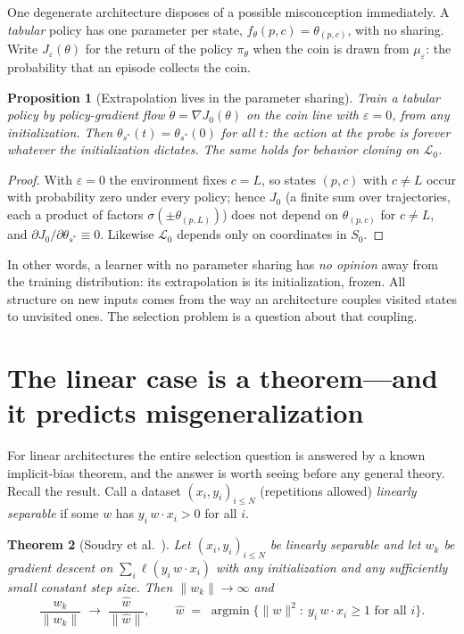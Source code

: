 \documentclass[11pt]{amsart}
\theoremstyle{plain}
\newtheorem{theorem}{Theorem}[section]
\newtheorem{proposition}[theorem]{Proposition}
\theoremstyle{definition}
\begin{document}
One degenerate architecture disposes of a possible misconception immediately. A \emph{tabular} policy has one parameter per state, $f_\theta(p,c)=\theta_{(p,c)}$, with no sharing. Write $J_\varepsilon(\theta)$ for the return of the policy $\pi_\theta$ when the coin is drawn from $\mu_\varepsilon$: the probability that an episode collects the coin.

\begin{proposition}[Extrapolation lives in the parameter sharing]\label{prop:tabular}
Train a tabular policy by policy-gradient flow $\dot\theta=\nabla J_0(\theta)$ on the coin line with $\varepsilon=0$, from any initialization. Then $\theta_{s^{*}}(t)=\theta_{s^{*}}(0)$ for all $t$: the action at the probe is forever whatever the initialization dictates. The same holds for behavior cloning on $\mathcal L_0$.
\end{proposition}

\begin{proof}
With $\varepsilon=0$ the environment fixes $c=L$, so states $(p,c)$ with $c\ne L$ occur with probability zero under every policy; hence $J_0$ (a finite sum over trajectories, each a product of factors $\sigma(\pm\theta_{(p,L)})$) does not depend on $\theta_{(p,c)}$ for $c\neq L$, and $\partial J_0/\partial\theta_{s^{*}}\equiv0$. Likewise $\mathcal L_0$ depends only on coordinates in $S_0$.
\end{proof}

In other words, a learner with no parameter sharing has \emph{no opinion} away from the training distribution: its extrapolation is its initialization, frozen. All structure on new inputs comes from the way an architecture couples visited states to unvisited ones. The selection problem is a question about that coupling.

\section{The linear case is a theorem---and it predicts misgeneralization}\label{sec:linear}

For linear architectures the entire selection question is answered by a known implicit-bias theorem, and the answer is worth seeing before any general theory. Recall the result. Call a dataset $(x_i,y_i)_{i\le N}$ (repetitions allowed) \emph{linearly separable} if some $w$ has $y_i\,w\cdot x_i>0$ for all $i$.

\begin{theorem}[{Soudry et al.~\cite{soudry2018}}]\label{thm:soudry}
Let $(x_i,y_i)_{i\le N}$ be linearly separable and let $w_k$ be gradient descent on $\sum_{i}\ell(y_i\,w\cdot x_i)$ with any initialization and any sufficiently small constant step size. Then $\|w_k\|\to\infty$ and
\[
   \frac{w_k}{\|w_k\|}\;\longrightarrow\;\frac{\hat w}{\|\hat w\|},
   \qquad
   \hat w \;=\; \operatorname*{argmin}\bigl\{\|w\|^2:\ y_i\,w\cdot x_i\ge1 \text{ for all } i\bigr\}.
\]
\end{theorem}
\end{document}
